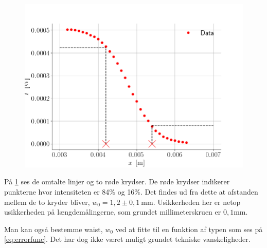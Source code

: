 \documentclass[main]{subfiles}
\begin{document}
\begin{figure}
  \centering
  \includegraphics[width=\linewidth]{tegninger/graf_find_w.png}
  \caption{}
  \label{fig:graf_find_w}
\end{figure}
På \cref{fig:graf_find_w} ses de omtalte linjer og to røde krydser. De røde krydser indikerer punkterne hvor intensiteten er 84\% og 16\%. Det findes ud fra dette at afstanden mellem de to kryder bliver, $w_0 = 1,2 \pm 0,1 \ \si{\milli\meter}$. Usikkerheden her er netop usikkerheden på længdemålingerne, som grundet millimeterskruen er $0,1 \si{\milli\meter}$.

Man kan også bestemme waist, $w_0$ ved at fitte til en funktion af typen som ses på \cref{eq:errorfunc}. Det har dog ikke været muligt grundet tekniske vanskeligheder.
\end{document}

